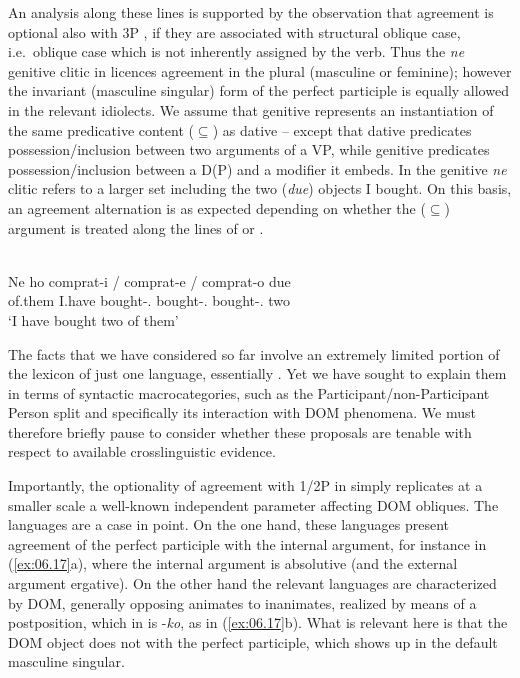 \documentclass[output=paper]{langsci/langscibook}
\begin{document}
An analysis along these lines is supported by the observation that agreement is
optional also with 3P , if they are associated with structural oblique
case, i.e.\ oblique case which is not inherently assigned by the verb. Thus the
\emph{ne} genitive clitic in  licences agreement in the plural
(masculine or feminine); however the invariant (masculine singular) form of the
perfect participle is equally allowed in the relevant idiolects. We assume that
genitive represents an instantiation of the same predicative content
(${\subseteq}$) as dative – except that dative predicates possession/inclusion
between two arguments of a VP, while genitive predicates possession/inclusion
between a D(P) and a modifier it embeds. In  the genitive
\emph{ne} clitic refers to a larger set including the two (\emph{due}) objects
I bought. On this basis, an agreement alternation is as expected depending on
whether the (${\subseteq}$) argument is treated along the lines of
 or .

\ea%
    \label{ex:06.16} \\
    \gll    Ne   ho   comprat-i / comprat-e / comprat-o   due\\
    of.them   I.have   bought-\M.\Pl{} {} bought-\glossF.\Pl{} {} bought-\M.\Sg{} two\\
    \glt    ‘I have bought two of them’
\z

The facts that we have considered so far involve an extremely limited portion
of the lexicon of just one language, essentially  . Yet we have
sought to explain them in terms of syntactic macrocategories, such as the
Participant\slash non-Participant Person split and specifically its interaction with
DOM phenomena. We must therefore briefly pause to consider whether these
proposals are tenable with respect to available crosslinguistic evidence.

Importantly, the optionality of agreement with 1/2P  in  simply
replicates at a smaller scale a well-known independent parameter affecting DOM
obliques. The  languages are a case in point. On the one hand, these
languages present agreement of the perfect participle with the internal
argument, for instance in  (\ref{ex:06.17}a), where the internal argument
is absolutive (and the external argument ergative). On the other hand the
relevant languages are characterized by DOM, generally opposing animates to
inanimates, realized by means of a postposition, which in  is -\emph{ko},
as in (\ref{ex:06.17}b). What is relevant here is that the \gls{DOM} object does not
 with the perfect participle, which shows up in the default
masculine singular.
\end{document}
